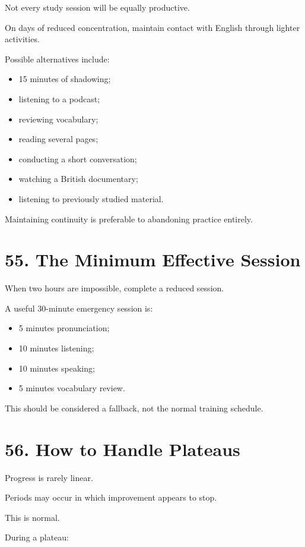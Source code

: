 Not every study session will be equally productive.

On days of reduced concentration, maintain contact with English through lighter activities.

Possible alternatives include:

\begin{itemize}
    \item 15 minutes of shadowing;
    \item listening to a podcast;
    \item reviewing vocabulary;
    \item reading several pages;
    \item conducting a short conversation;
    \item watching a British documentary;
    \item listening to previously studied material.
\end{itemize}

Maintaining continuity is preferable to abandoning practice entirely.

\section*{55. The Minimum Effective Session}

When two hours are impossible, complete a reduced session.

A useful 30-minute emergency session is:

\begin{itemize}
    \item 5 minutes pronunciation;
    \item 10 minutes listening;
    \item 10 minutes speaking;
    \item 5 minutes vocabulary review.
\end{itemize}

This should be considered a fallback, not the normal training schedule.

\section*{56. How to Handle Plateaus}

Progress is rarely linear.

Periods may occur in which improvement appears to stop.

This is normal.

During a plateau:

